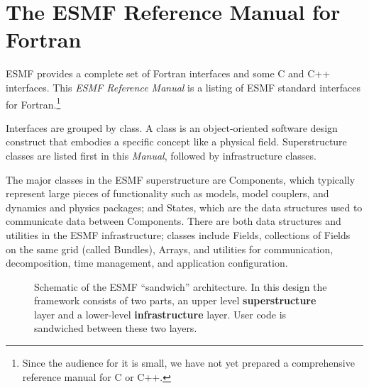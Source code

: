 



\section{The ESMF Reference Manual for Fortran}

ESMF provides a complete set of Fortran interfaces and
some C and C++ interfaces.  This {\it ESMF Reference Manual} is a listing of 
ESMF standard interfaces for Fortran.\footnote{Since the audience for it is 
small, we have not yet prepared a comprehensive reference manual for C 
or C++.}  

Interfaces are grouped by class.  A class is an object-oriented software 
design construct that embodies 
a specific concept like a physical field.  Superstructure classes 
are listed first in this {\it Manual}, followed by infrastructure 
classes.

The major classes in the ESMF superstructure are Components, which 
typically represent
large pieces of functionality such as models, model couplers, and 
dynamics and physics packages; and States, which are the data structures
used to communicate data between Components.  There are both data
structures and utilities in the ESMF 
infrastructure; classes include Fields, collections of Fields on the 
same grid (called Bundles), Arrays, and utilities for communication,
decomposition, time management, and application configuration.

\begin{center}
\begin{figure}
\caption{Schematic of the ESMF ``sandwich'' architecture. In this
design the framework consists of two parts, an upper level
{\bf superstructure} layer and a lower-level {\bf infrastructure} layer.
User code is sandwiched between these two layers.}
\label{fig:TheESMFwich}
\end{figure}
\end{center}

